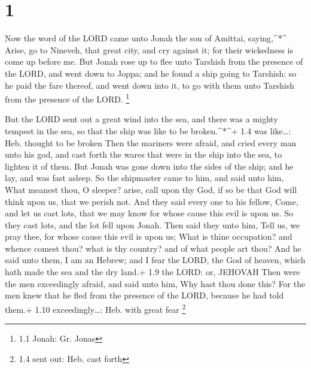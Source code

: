 \hypertarget{section}{%
\section{1}\label{section}}

 Now the word of the LORD came unto Jonah the son of
Amittai, saying,\^{}*\^{}  Arise, go to Nineveh, that great
city, and cry against it; for their wickedness is come up before me.
 But Jonah rose up to flee unto Tarshish from the presence
of the LORD, and went down to Joppa; and he found a ship going to
Tarshish: so he paid the fare thereof, and went down into it, to go with
them unto Tarshish from the presence of the LORD. \footnote{1.1 Jonah:
  Gr. Jonas}

 But the LORD sent out a great wind into the sea, and there
was a mighty tempest in the sea, so that the ship was like to be
broken.\^{}*\^{}+ 1.4 was like\ldots: Heb. thought to be broken
 Then the mariners were afraid, and cried every man unto his
god, and cast forth the wares that were in the ship into the sea, to
lighten it of them. But Jonah was gone down into the sides of the ship;
and he lay, and was fast asleep.  So the shipmaster came to
him, and said unto him, What meanest thou, O sleeper? arise, call upon
thy God, if so be that God will think upon us, that we perish not.
 And they said every one to his fellow, Come, and let us
cast lots, that we may know for whose cause this evil is upon us. So
they cast lots, and the lot fell upon Jonah.  Then said they
unto him, Tell us, we pray thee, for whose cause this evil is upon us;
What is thine occupation? and whence comest thou? what is thy country?
and of what people art thou?  And he said unto them, I am an
Hebrew; and I fear the LORD, the God of heaven, which hath made the sea
and the dry land.+ 1.9 the LORD: or, JEHOVAH  Then were the
men exceedingly afraid, and said unto him, Why hast thou done this? For
the men knew that he fled from the presence of the LORD, because he had
told them.+ 1.10 exceedingly\ldots: Heb. with great fear \footnote{1.4
  sent out: Heb. cast forth}

